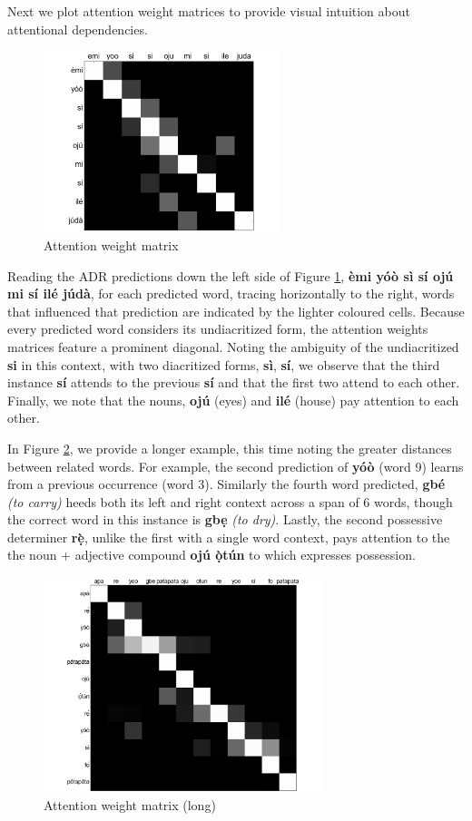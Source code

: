 \documentclass[a4paper]{article}
\begin{document}
Next we plot attention weight matrices to provide visual intuition about attentional dependencies. 
\begin{figure}[h]
  \centering
  \includegraphics[width=2.7in]{emi_yoo_AttentionWeights.pdf}
  \caption{Attention weight matrix}
  \label{fig:attention_weights_emiyoo}
\end{figure}
Reading the ADR predictions down the left side of Figure \ref{fig:attention_weights_emiyoo}, \textbf{{\`e}mi y{\'o}{\`o} s{\`i} s{\'i} oj{\'u} mi s{\'i} il{\'e} j{\'u}d{\`a}}, for each predicted word, tracing horizontally to the right, words that influenced that prediction are indicated by the lighter coloured cells. Because every predicted word considers its undiacritized form, the attention weights matrices feature a prominent diagonal. Noting the ambiguity of the undiacritized \textbf{si} in this context, with two diacritized forms, \textbf{s{\`i}}, \textbf{s{\'i}}, we observe that the third instance \textbf{s{\'i}} attends to the previous \textbf{s{\'i}} and that the first two attend to each other. Finally, we note that the nouns, \textbf{oj{\'u}} (eyes) and \textbf{il{\'e}} (house) pay attention to each other.

In Figure \ref{fig:attention_weights_patapata}, we provide a longer example, this time noting the greater distances between related words. For example, the second prediction of \textbf{y{\'o}{\`o}} (word 9) learns from a previous occurrence (word 3). Similarly the fourth word predicted, \textbf{gb{\'e}} \emph{(to carry)} heeds both its left and right context across a span of 6 words, though the correct word in this instance is \textbf{gb\d{e}} \emph{(to dry)}. Lastly, the second possessive determiner \textbf{r\d{\`e}}, unlike the first with a single word context, pays attention to the the noun + adjective compound  \textbf{oj{\'u} \textbf{\d{\`o}t{\'u}n}} to which expresses possession.
\begin{figure}[h]
  \centering
  \includegraphics[width=3.2in]{patapata_AttentionWeights.pdf}
  \caption{Attention weight matrix (long)}
  \label{fig:attention_weights_patapata}
\end{figure}
\end{document}
